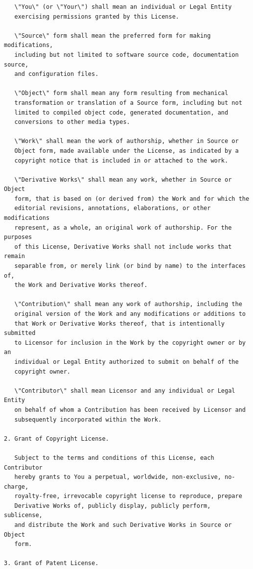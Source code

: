 \documentclass[12pt,a4paper]{article}
\begin{document}
\begin{verbatim}
   \"You\" (or \"Your\") shall mean an individual or Legal Entity
   exercising permissions granted by this License.

   \"Source\" form shall mean the preferred form for making modifications,
   including but not limited to software source code, documentation source,
   and configuration files.

   \"Object\" form shall mean any form resulting from mechanical
   transformation or translation of a Source form, including but not
   limited to compiled object code, generated documentation, and
   conversions to other media types.

   \"Work\" shall mean the work of authorship, whether in Source or
   Object form, made available under the License, as indicated by a
   copyright notice that is included in or attached to the work.

   \"Derivative Works\" shall mean any work, whether in Source or Object
   form, that is based on (or derived from) the Work and for which the
   editorial revisions, annotations, elaborations, or other modifications
   represent, as a whole, an original work of authorship. For the purposes
   of this License, Derivative Works shall not include works that remain
   separable from, or merely link (or bind by name) to the interfaces of,
   the Work and Derivative Works thereof.

   \"Contribution\" shall mean any work of authorship, including the
   original version of the Work and any modifications or additions to
   that Work or Derivative Works thereof, that is intentionally submitted
   to Licensor for inclusion in the Work by the copyright owner or by an
   individual or Legal Entity authorized to submit on behalf of the
   copyright owner.

   \"Contributor\" shall mean Licensor and any individual or Legal Entity
   on behalf of whom a Contribution has been received by Licensor and
   subsequently incorporated within the Work.

2. Grant of Copyright License.

   Subject to the terms and conditions of this License, each Contributor
   hereby grants to You a perpetual, worldwide, non-exclusive, no-charge,
   royalty-free, irrevocable copyright license to reproduce, prepare
   Derivative Works of, publicly display, publicly perform, sublicense,
   and distribute the Work and such Derivative Works in Source or Object
   form.

3. Grant of Patent License.


\end{verbatim}
\end{document}
